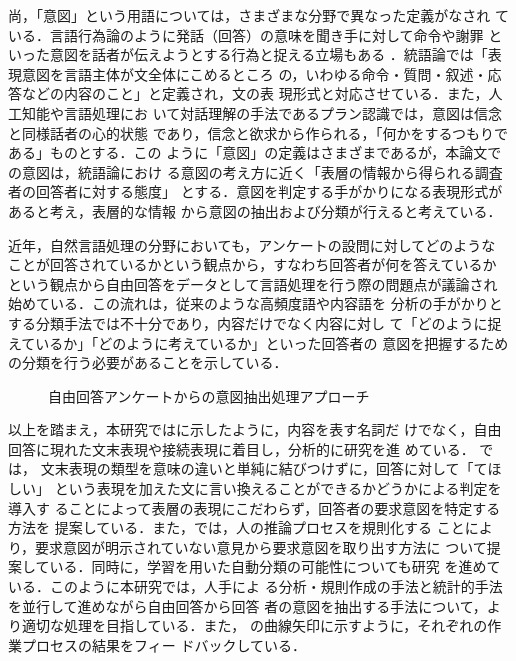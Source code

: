 尚，「意図」という用語については，さまざまな分野で異なった定義がなされ
ている．言語行為論のように発話（回答）の意味を聞き手に対して命令や謝罪
といった意図を話者が伝えようとする行為と捉える立場もある
\cite{searle:69}．統語論では「表現意図を言語主体が文全体にこめるところ
の，いわゆる命令・質問・叙述・応答などの内容のこと」と定義され，文の表
現形式と対応させている\cite{kokken:60}．また，人工知能や言語処理にお
いて対話理解の手法であるプラン認識では，意図は信念と同様話者の心的状態
であり，信念と欲求から作られる，「何かをするつもりである」ものとする．この
ように「意図」の定義はさまざまであるが，本論文での意図は，統語論におけ
る意図の考え方に近く「表層の情報から得られる調査者の回答者に対する態度」
とする．意図を判定する手がかりになる表現形式があると考え，表層的な情報
から意図の抽出および分類が行えると考えている．

近年，自然言語処理の分野においても，アンケートの設問に対してどのような
ことが回答されているかという観点から，すなわち回答者が何を答えているか
という観点から自由回答をデータとして言語処理を行う際の問題点が議論され
始めている\cite{lebart:98}．この流れは，従来のような高頻度語や内容語を
分析の手がかりとする分類手法では不十分であり，内容だけでなく内容に対し
て「どのように捉えているか」「どのように考えているか」といった回答者の
意図を把握するための分類を行う必要があることを示している．

\begin{figure}[t]
\begin{center}
\leavevmode
{}
\caption{自由回答アンケートからの意図抽出処理アプローチ}
\label{fig:figure1}
\end{center}
\end{figure}

以上を踏まえ，本研究ではに示したように，内容を表す名詞だ
けでなく，自由回答に現れた文末表現や接続表現に着目し，分析的に研究を進
めている\cite{inui:98:a,inui:01:a,inui:01:b}．\cite{inui:01:a} では，
文末表現の類型を意味の違いと単純に結びつけずに，回答に対して「てほしい」
という表現を加えた文に言い換えることができるかどうかによる判定を導入す
ることによって表層の表現にこだわらず，回答者の要求意図を特定する方法を
提案している．また，\cite{inui:01:b}では，人の推論プロセスを規則化する
ことにより，要求意図が明示されていない意見から要求意図を取り出す方法に
ついて提案している．同時に，学習を用いた自動分類の可能性についても研究
を進めている\cite{inui:98:b,inui:01:c}．このように本研究では，人手によ
る分析・規則作成の手法と統計的手法を並行して進めながら自由回答から回答
者の意図を抽出する手法について，より適切な処理を目指している．また，
の曲線矢印に示すように，それぞれの作業プロセスの結果をフィー
ドバックしている．


